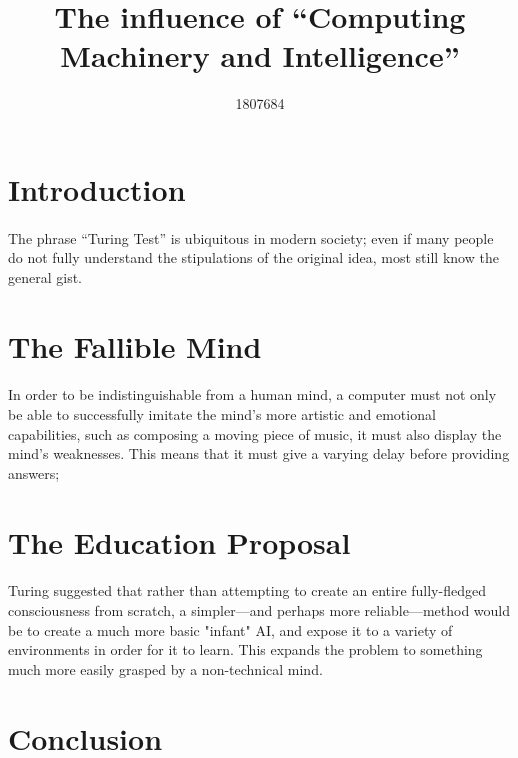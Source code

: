 \documentclass{scrartcl}
\title{The influence of “Computing Machinery and Intelligence”}
\author{1807684}
\begin{document}
\maketitle

\section{Introduction}
\paragraph{}
The phrase “Turing Test” is ubiquitous in modern society; even if many people do not fully understand the stipulations of the original idea, most still know the general gist.

\section{The Fallible Mind}
\paragraph{}
In order to be indistinguishable from a human mind, a computer must not  only be able to successfully imitate the mind's more artistic and emotional capabilities, such as composing a moving piece of music, it must also display the mind's weaknesses. This means that it must give a varying delay before providing answers; 

\section{The Education Proposal}
\paragraph{}  %
Turing suggested\cite{Main} that rather than attempting to create an entire fully-fledged consciousness from scratch, a simpler—and perhaps more reliable—method would be to create a much more basic "infant" AI, and expose it to a variety of environments in order for it to learn. This expands the problem to something much more easily grasped by a non-technical mind.\cite{Infants}

\section{Conclusion}
\paragraph{}




\end{document}
